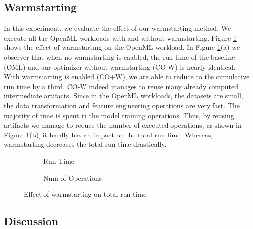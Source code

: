 \subsection{Warmstarting}
In this experiment, we evaluate the effect of our warmstarting method.
We execute all the OpenML workloads with and without warmstarting.
Figure \ref{exp-model-warmstarting} shows the effect of warmstarting on the OpenML workload.
In Figure \ref{exp-model-warmstarting}(a) we observer that when no warmstarting is enabled, the run time of the baseline (OML) and our optimizer without warmstarting (CO-W) is nearly identical.
With warmstarting is enabled (CO+W), we are able to reduce to the cumulative run time by a third.
CO-W indeed manages to reuse many already computed intermediate artifacts.
Since in the OpenML workloads, the datasets are small, the data transformation and feature engineering operations are very fast.
The majority of time is spent in the model training operations.
Thus, by reusing artifacts we manage to reduce the number of executed operations, as shown in Figure \ref{exp-model-warmstarting}(b),  it hardly has an impact on the total run time.
Whereas, warmstarting decreases the total run time drastically.

\begin{figure}
\begin{subfigure}[b]{0.5\linewidth}
\centering
 \resizebox{\columnwidth}{!}{%
%
}
\caption{Run Time}
\end{subfigure}%
\begin{subfigure}[b]{0.5\linewidth}
\centering
 \resizebox{\columnwidth}{!}{%
%
}
\caption{Num of Operations}
\end{subfigure}
\caption{Effect of warmstarting on total run time}
\label{exp-model-warmstarting}
\end{figure}

\subsection{Discussion}
